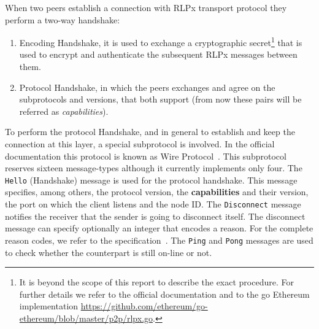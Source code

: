 When two peers establish a connection with RLPx transport protocol they perform
a two-way handshake:
\begin{enumerate}
    \item Encoding Handshake, it is used to exchange a cryptographic 
    secret\footnote{It is beyond the scope of this report to describe the exact 
    procedure. For further details we refer to the official documentation 
    \cite{rlpx} and to the go Ethereum implementation 
    \url{https://github.com/ethereum/go-ethereum/blob/master/p2p/rlpx.go}.}
    that is used to encrypt and authenticate the subsequent RLPx messages 
    between them.
    \item Protocol Handshake, in which the peers exchanges and agree on the 
    subprotocols and versions, that both support (from now these pairs will be 
    referred as \emph{capabilities}).
\end{enumerate}

To perform the protocol Handshake, and in general to establish and keep the
connection at this layer, a special subprotocol is involved. In the official
documentation this protocol is known as \devpp{} Wire 
Protocol~\cite{devp2pwire}. This subprotocol reserves sixteen message-types 
although it currently implements only four. The \verb+Hello+ (Handshake) 
message is used for the protocol handshake. This message specifies, among
others, the protocol version, the \textbf{capabilities} and their version, the 
port on which the client listens and the node ID. The \verb+Disconnect+ message 
notifies the receiver that the sender is going to disconnect itself. The 
disconnect message can specify optionally an integer that encodes a reason. For 
the complete reason codes, we refer to the \devpp{} 
specification~\cite{devp2pwire}. The \verb+Ping+ and \verb+Pong+ messages are 
used to check whether the counterpart is still on-line or not.

